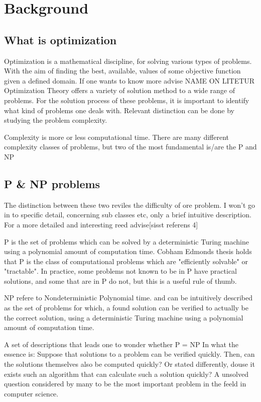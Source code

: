 \section{Background}

\subsection{What is optimization}

Optimization is a mathematical discipline, for solving various types of problems. With the aim of finding the best, available, values of some objective function given a defined domain. If one wants to know more advise NAME ON LITETUR\\

Optimization Theory offers a variety of solution method to a wide range of problems. For the solution process of these problems, it is important to identify what kind of problems one deals with.
Relevant distinction can be done by studying the problem complexity.

Complexity is more or less computational time. There are many different complexity classes of problems, but two of the most fundamental is/are the P and NP

\subsection{P \& NP problems}

The distinction between these two reviles the difficulty of ore problem. I won't go in to specific detail, concerning sub classes etc, only a brief intuitive description.
For a more detailed and interesting reed advise[sisst referens 4]

P is the set of problems which can be solved by a deterministic Turing machine using a polynomial amount of computation time.
Cobham Edmonds thesis holds that P is the class of computational problems which are "efficiently solvable" or "tractable". In practice, some problems not known to be in P have practical solutions, and some that are in P do not, but this is a useful rule of thumb.

NP refere to Nondeterministic Polynomial time. and can be intuitively described as the set of problems for which, a found solution can be verified to actually be the correct solution, using a deterministic Turing machine using a polynomial amount of computation time.

A set of descriptions that leads one to wonder whether
P = NP
In what the essence is:
Suppose that solutions to a problem can be verified quickly. Then, can the solutions themselves also be computed quickly?
Or stated differently, douse it exists such an algorithm that can calculate such a solution quickly?
A unsolved question considered by many to be the most important problem in the feeld in computer science. 

